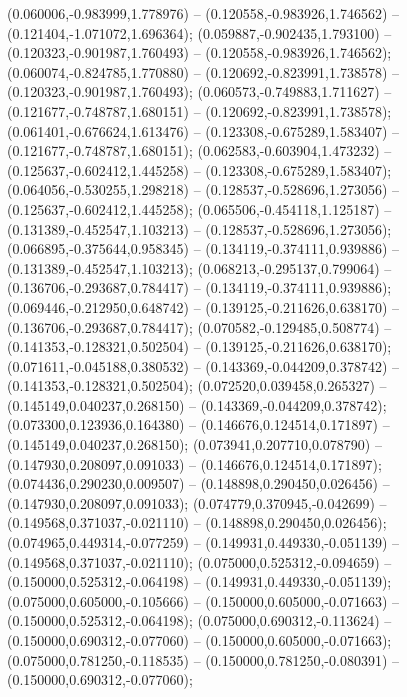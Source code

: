  (0.060006,-0.983999,1.778976) -- (0.120558,-0.983926,1.746562) -- (0.121404,-1.071072,1.696364);
 (0.059887,-0.902435,1.793100) -- (0.120323,-0.901987,1.760493) -- (0.120558,-0.983926,1.746562);
 (0.060074,-0.824785,1.770880) -- (0.120692,-0.823991,1.738578) -- (0.120323,-0.901987,1.760493);
 (0.060573,-0.749883,1.711627) -- (0.121677,-0.748787,1.680151) -- (0.120692,-0.823991,1.738578);
 (0.061401,-0.676624,1.613476) -- (0.123308,-0.675289,1.583407) -- (0.121677,-0.748787,1.680151);
 (0.062583,-0.603904,1.473232) -- (0.125637,-0.602412,1.445258) -- (0.123308,-0.675289,1.583407);
 (0.064056,-0.530255,1.298218) -- (0.128537,-0.528696,1.273056) -- (0.125637,-0.602412,1.445258);
 (0.065506,-0.454118,1.125187) -- (0.131389,-0.452547,1.103213) -- (0.128537,-0.528696,1.273056);
 (0.066895,-0.375644,0.958345) -- (0.134119,-0.374111,0.939886) -- (0.131389,-0.452547,1.103213);
 (0.068213,-0.295137,0.799064) -- (0.136706,-0.293687,0.784417) -- (0.134119,-0.374111,0.939886);
 (0.069446,-0.212950,0.648742) -- (0.139125,-0.211626,0.638170) -- (0.136706,-0.293687,0.784417);
 (0.070582,-0.129485,0.508774) -- (0.141353,-0.128321,0.502504) -- (0.139125,-0.211626,0.638170);
 (0.071611,-0.045188,0.380532) -- (0.143369,-0.044209,0.378742) -- (0.141353,-0.128321,0.502504);
 (0.072520,0.039458,0.265327) -- (0.145149,0.040237,0.268150) -- (0.143369,-0.044209,0.378742);
 (0.073300,0.123936,0.164380) -- (0.146676,0.124514,0.171897) -- (0.145149,0.040237,0.268150);
 (0.073941,0.207710,0.078790) -- (0.147930,0.208097,0.091033) -- (0.146676,0.124514,0.171897);
 (0.074436,0.290230,0.009507) -- (0.148898,0.290450,0.026456) -- (0.147930,0.208097,0.091033);
 (0.074779,0.370945,-0.042699) -- (0.149568,0.371037,-0.021110) -- (0.148898,0.290450,0.026456);
 (0.074965,0.449314,-0.077259) -- (0.149931,0.449330,-0.051139) -- (0.149568,0.371037,-0.021110);
 (0.075000,0.525312,-0.094659) -- (0.150000,0.525312,-0.064198) -- (0.149931,0.449330,-0.051139);
 (0.075000,0.605000,-0.105666) -- (0.150000,0.605000,-0.071663) -- (0.150000,0.525312,-0.064198);
 (0.075000,0.690312,-0.113624) -- (0.150000,0.690312,-0.077060) -- (0.150000,0.605000,-0.071663);
 (0.075000,0.781250,-0.118535) -- (0.150000,0.781250,-0.080391) -- (0.150000,0.690312,-0.077060);
